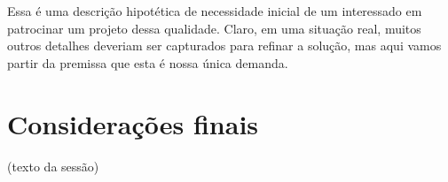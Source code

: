       Essa é uma descrição hipotética de necessidade inicial de um interessado em patrocinar um projeto dessa qualidade. Claro, em uma situação real, muitos outros detalhes deveriam ser capturados para refinar a solução, mas aqui vamos partir da premissa que esta é nossa única demanda.

    

  \section{Considerações finais}

    (texto da sessão)

  \clearpage

  \renewcommand\refname{Referências}

    
    


